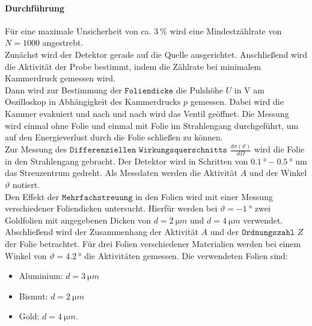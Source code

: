 \paragraph{Durchführung}
Für eine maximale Unsicherheit von ca. $\SI{3}{\%}$ wird eine Mindestzählrate von  $N=1000$ angestrebt.
\\Zunächst wird der Detektor gerade auf die Quelle ausgerichtet.
Anschließend wird die Aktivität der Probe bestimmt, indem die Zählrate bei minimalem Kammerdruck gemessen wird.
\\Dann wird zur Bestimmung der $\texttt{Foliendicke}$ die Pulshöhe $U$ in V am Oszilloskop in Abhängigkeit des Kammerdrucks $p$ gemessen.
Dabei wird die Kammer evakuiert und nach und nach wird das Ventil geöffnet.
Die Messung wird einmal ohne Folie und einmal mit Folie im Strahlengang durchgeführt, um auf den Energieverlust durch die Folie schließen zu können.
\\Zur Messung des $\texttt{Differenziellen Wirkungsquerschnitts}$ $\displaystyle{ \frac{d\sigma (\vartheta)}{d\Omega}}$ wird die Folie in den Strahlengang gebracht.
Der Detektor wird in Schritten von $\SI{0.1}{°} - \SI{0.5}{°}$ um das Streuzentrum gedreht.
Als Messdaten werden die Aktivität $A$ und der Winkel $\vartheta$ notiert.
\\Den Effekt der $\texttt{Mehrfachstreuung}$ in den Folien wird mit einer Messung verschiedener Foliendicken untersucht.
Hierfür werden bei $\vartheta = \SI{-1}{°}$ zwei Goldfolien mit angegebenen Dicken von $d=\SI{2}{\micro m}$ und $d = \SI{4}{\micro m}$ verwendet.
\\Abschließend wird der Zusammenhang der Aktivität $A$ und der $\texttt{Ordnungszahl}$ $Z$ der Folie betrachtet.
Für drei Folien verschiedener Materialien werden bei einem Winkel von $\vartheta = \SI{4.2}{°}$ die Aktivitäten gemessen.
Die verwendeten Folien sind:
\begin{itemize}
	\item Aluminium: $d=\SI{3}{\micro m}$
	\item Bismut: $d=\SI{2}{\micro m}$
	\item Gold: $d=\SI{4}{\micro m}$.
\end{itemize}
%
%
